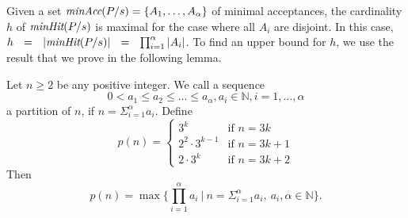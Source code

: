 Given a set $\text{\it minAcc}(P/s) = \{ A_1,\dots, A_\alpha \}$ of   minimal
acceptances, the cardinality $h$ of $\text{\it minHit}(P/s)$ is maximal for the case
where all $A_i$ are disjoint. In this case,  $h~~=~~|\text{\it minHit}(P/s)|~~=~~
\prod_{i=1}^\alpha|A_i|$. To find an upper bound for $h$, we use the result
that we prove in the following lemma.
%
\begin{lemma}\label{lemma:minhitmax}
Let $n\ge 2$ be any positive integer. We call a sequence
%
$$0 < a_1\le a_2\le \ldots\le  a_{\alpha}, a_i\in \mathbb{N}, i=1,\dots, \alpha$$
%
a partition of $n$, if $n=\Sigma_{i=1}^{\alpha}a_i$. Define
%
$$p(n)=\begin{cases} 3^k &\text{if}\,\, n=3k\\ 2^2\cdot 3^{k-1} &\text{if}\,\, n=3k+1\\2\cdot 3^{k} &\text{if}\,\, n=3k+2\end{cases}$$
Then  $$p(n)=\max\big\{\prod_{i=1}^{\alpha}a_i~|~n=\Sigma_{i=1}^{\alpha}a_i,\ a_i,
\alpha\in \mathbb{N}\big\}.$$
%
\end{lemma}
